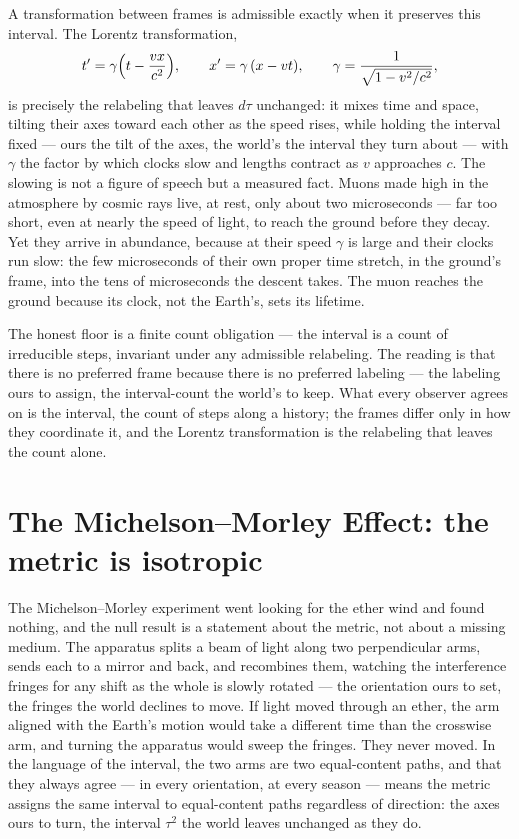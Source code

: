 A transformation between frames is admissible exactly when it preserves this interval. The Lorentz
transformation,
\begin{equation}
  t' = \gamma\Bigl(t - \frac{vx}{c^2}\Bigr), \qquad x' = \gamma\,(x - vt), \qquad
  \gamma = \frac{1}{\sqrt{1 - v^2/c^2}},
\end{equation}
is precisely the relabeling that leaves $d\tau$ unchanged: it mixes time and space, tilting their axes toward
each other as the speed rises, while holding the interval fixed --- ours the tilt of the axes, the world's the interval they turn about ---
with $\gamma$ the factor by which clocks slow
and lengths contract as $v$ approaches $c$. The slowing is not a figure of speech but a measured fact. Muons
made high in the atmosphere by cosmic rays live, at rest, only about two microseconds --- far too short, even
at nearly the speed of light, to reach the ground before they decay. Yet they arrive in abundance, because at
their speed $\gamma$ is large and their clocks run slow: the few microseconds of their own proper time stretch,
in the ground's frame, into the tens of microseconds the descent takes. The muon reaches the ground because its
clock, not the Earth's, sets its lifetime.

The honest floor is a finite count obligation --- the interval is a
count of irreducible steps, invariant under any admissible relabeling. The reading is that there is no
preferred frame because there is no preferred labeling --- the labeling ours to assign, the interval-count the
world's to keep. What every observer agrees on is the interval, the count of steps along a history; the frames differ only in how they coordinate it, and the Lorentz
transformation is the relabeling that leaves the count alone.

\section{The Michelson--Morley Effect: the metric is isotropic}
\label{se:michelson-morley}

The Michelson--Morley experiment went looking for the ether wind and found nothing, and the null result is a
statement about the metric, not about a missing medium. The apparatus splits a beam of light along two
perpendicular arms, sends each to a mirror and back, and recombines them, watching the interference fringes for
any shift as the whole is slowly rotated --- the orientation ours to set, the fringes the world declines to
move. If light moved through an ether, the arm aligned with the Earth's
motion would take a different time than the crosswise arm, and turning the apparatus would sweep the fringes.
They never moved. In the language of the interval, the two arms are two equal-content paths, and that they
always agree --- in every orientation, at every season --- means the metric assigns the same interval to
equal-content paths regardless of direction: the axes ours to turn, the interval $\tau^2$ the world leaves
unchanged as they do.

